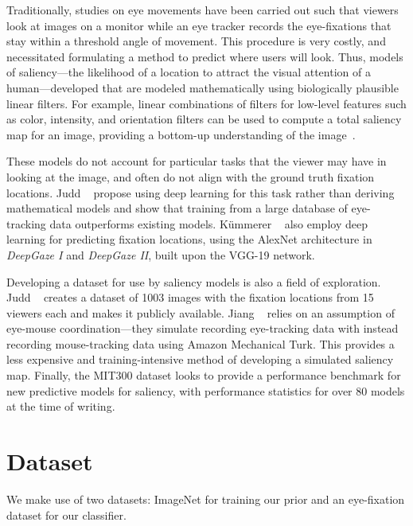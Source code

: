\documentclass[10pt,twocolumn,letterpaper]{article}
\begin{document}
Traditionally, studies on eye movements have been carried out such that
viewers look at images on a monitor while an eye tracker records the
eye-fixations that stay within a threshold angle of movement. This procedure is
very costly, and necessitated formulating a method to predict where users will
look. Thus, models of saliency---the likelihood of a location to attract the
visual attention of a human---developed that are modeled mathematically using
biologically plausible linear filters. For example, linear combinations of
filters for low-level features such as color, intensity, and orientation
filters can be used to compute a total saliency map for an image,
providing a bottom-up understanding of the image~\cite{Itti}.

These models do not account for particular tasks that the viewer may have in
looking at the image, and often do not align with the ground truth fixation
locations. Judd \etal~\cite{Judd} propose using deep learning for this task
rather than deriving mathematical models and show that training from a large
database of eye-tracking data outperforms existing models. K\"ummerer
\etal~\cite{Kummerer} also employ deep learning for predicting fixation
locations, using the AlexNet architecture in \textit{DeepGaze I} and \textit{DeepGaze II}, built upon the VGG-19 network.

Developing a dataset for use by saliency models is also a field of exploration.
Judd \etal~\cite{Judd} creates a dataset of 1003 images with the fixation
locations from 15 viewers each and makes it publicly available. Jiang
\etal~\cite{Jiang} relies on an assumption of eye-mouse coordination---they
simulate recording eye-tracking data with instead recording mouse-tracking data
using Amazon Mechanical Turk. This provides a less expensive and
training-intensive method of developing a simulated saliency map. Finally, the
MIT300 dataset \cite{mitbench} looks to provide a performance benchmark for new predictive
models for saliency, with performance statistics for over 80 models at the time
of writing. 


\section{Dataset}
We make use of two datasets: ImageNet for training our prior and an
eye-fixation dataset for our classifier. 
\end{document}
